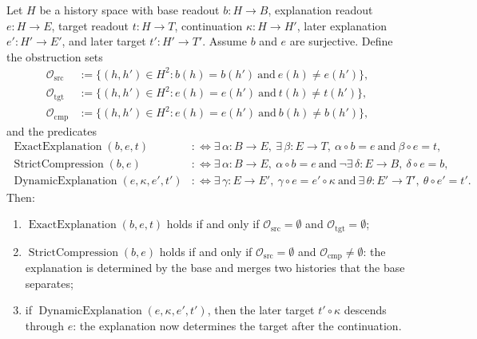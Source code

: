 \begin{theorem}\label{thm:F30}
Let \(H\) be a history space with base readout \(b:H\to B\),
explanation readout \(e:H\to E\), target readout \(t:H\to T\),
continuation \(\kappa:H\to H'\), later explanation
\(e':H'\to E'\), and later target \(t':H'\to T'\).  Assume \(b\)
and \(e\) are surjective.  Define the obstruction sets
\begin{align*}
  \mathcal O_{\mathrm{src}}
  &:=
  \{(h,h')\in H^2:b(h)=b(h')\ \text{and}\ e(h)\ne e(h')\},\\
  \mathcal O_{\mathrm{tgt}}
  &:=
  \{(h,h')\in H^2:e(h)=e(h')\ \text{and}\ t(h)\ne t(h')\},\\
  \mathcal O_{\mathrm{cmp}}
  &:=
  \{(h,h')\in H^2:e(h)=e(h')\ \text{and}\ b(h)\ne b(h')\},
\end{align*}
and the predicates
\begin{align*}
  \operatorname{ExactExplanation}(b,e,t)
  &:\Longleftrightarrow
  \exists\,\alpha:B\to E,\ \exists\,\beta:E\to T,\
    \alpha\circ b=e\ \text{and}\ \beta\circ e=t,\\
  \operatorname{StrictCompression}(b,e)
  &:\Longleftrightarrow
  \exists\,\alpha:B\to E,\ \alpha\circ b=e
  \ \text{and}\ 
  \neg\exists\,\delta:E\to B,\ \delta\circ e=b,\\
  \operatorname{DynamicExplanation}(e,\kappa,e',t')
  &:\Longleftrightarrow
  \exists\,\gamma:E\to E',\ \gamma\circ e=e'\circ\kappa
  \ \text{and}\
  \exists\,\theta:E'\to T',\ \theta\circ e'=t'.
\end{align*}
Then:
\begin{enumerate}[label=(\roman*)]
\item \(\operatorname{ExactExplanation}(b,e,t)\) holds if and only if
  \(\mathcal O_{\mathrm{src}}=\emptyset\) and
  \(\mathcal O_{\mathrm{tgt}}=\emptyset\);
\item \(\operatorname{StrictCompression}(b,e)\) holds if and only if
  \(\mathcal O_{\mathrm{src}}=\emptyset\) and
  \(\mathcal O_{\mathrm{cmp}}\ne\emptyset\): the explanation is determined by
  the base and merges two histories that the base separates;
\item if \(\operatorname{DynamicExplanation}(e,\kappa,e',t')\), then the later
  target \(t'\circ\kappa\) descends through \(e\): the explanation now
  determines the target after the continuation.
\end{enumerate}
\end{theorem}
